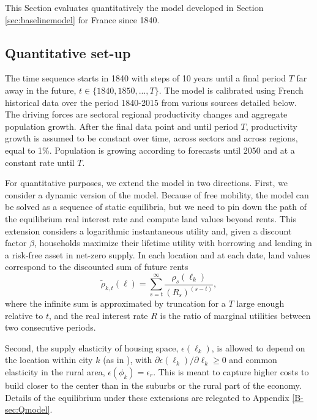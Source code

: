 \documentclass[./20250130-paper.tex]{subfiles}
\begin{document}
This Section evaluates quantitatively the model developed in Section \ref{sec:baselinemodel} for France since 1840.

\subsection{Quantitative set-up}\label{sec:setup}

The time sequence starts in 1840 with steps of 10 years until a final period $T$ far away in the future, $t \in \{1840, 1850,..., T\}$. The model is calibrated using French historical data over the period 1840-2015 from various sources detailed below. The driving forces are sectoral regional productivity changes and aggregate population growth. After the final data point and until period $T$, productivity growth is assumed to be constant over time, across sectors and across regions, equal to 1\%. Population is growing according to forecasts until 2050 and at a constant rate until $T$. 

For quantitative purposes, we extend the model in two directions. First, we consider a dynamic version of the model. Because of free mobility, the model can be solved as a sequence of static equilibria, but we need to pin down the path of the equilibrium real interest rate and compute land values beyond rents. This extension considers a logarithmic instantaneous utility and, given a discount factor $\beta$, households maximize their lifetime utility with borrowing and lending in a risk-free asset in net-zero supply. In each location and at each date, land values correspond to the discounted sum of future rents 
\begin{equation*}
	\tilde{\rho}_{k,t}(\ell) = \sum_{s=t}^\infty \frac{\rho_s(\ell_k)}{(R_s)^{(s-t)}},
\end{equation*}
where the infinite sum is approximated by truncation for a $T$ large enough relative to $t$, and the real interest rate $R$ is the ratio of marginal utilities between two consecutive periods.

Second, the supply elasticity of housing space, $\epsilon(\ell_k)$, is allowed to depend on the location within city $k$ (as in \cite{baumsnowhan2020}), with $\partial\epsilon(\ell_k)/\partial\ell_k\geq 0$ and common elasticity in the rural area, $\epsilon(\phi_k)=\epsilon_r$. This is meant to capture higher costs to build closer to the center than in the suburbs or the rural part of the economy. Details of the equilibrium under these extensions are relegated to Appendix \ref{B-sec:Qmodel}. 
\end{document}
